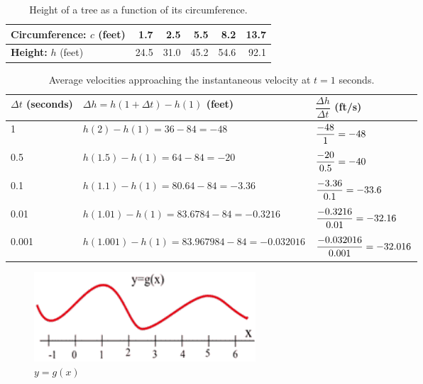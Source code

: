 \begin{enumerate}[label=(\alph*)]

\begin{table}[ht!]
    \centering
    \begin{tabular}{l*{5}{r}}
    \toprule
    {\bf Circumference:} $c$ (feet) & 1.7 & 2.5 & 5.5 & 8.2 & 13.7\tabularnewline
    \midrule
    {\bf Height:} $h$ (feet) & 24.5 & 31.0 & 45.2 & 54.6 & 92.1\tabularnewline
    \bottomrule
    \end{tabular}
    \caption{Height of a tree as a function of its circumference.}
    \label{tab:1-tree}
\end{table}

\begin{table}[ht!]
    \centering
    \begin{tabular}{lll}
    \toprule
    $\Delta t$ (seconds) & $\Delta h = h(1+\Delta t)-h(1)$ (feet) & $\dfrac{\Delta h}{\Delta t}$ (ft/s) \\
    \midrule
    1       & $h(2) - h(1) = 36-84 = -48$                   & $\dfrac{-48\mathstrut}{1\mathstrut} = -48$ \\
    0.5     & $h(1.5) - h(1) = 64-84 = -20$                 & $\dfrac{-20\mathstrut}{0.5\mathstrut} = -40$ \\
    0.1     & $h(1.1) - h(1) = 80.64-84 = -3.36$            & $\dfrac{-3.36\mathstrut}{0.1\mathstrut} = -33.6$ \\
    0.01    & $h(1.01) - h(1) = 83.6784-84 = -0.3216$       & $\dfrac{-0.3216\mathstrut}{0.01\mathstrut} = -32.16$ \\
    0.001   & $h(1.001) - h(1) = 83.967984-84 = -0.032016$  & $\dfrac{-0.032016\mathstrut}{0.001\mathstrut} = -32.016$ \\
    \bottomrule
    \end{tabular}
    \caption{Average velocities approaching the instantaneous velocity at $t=1$ seconds.}
    \label{tab:2-2-tomato-velocity}
\end{table}

\begin{figure}[!ht]
  \centering
    \includegraphics[width=0.4\textwidth]{img/chap2/image006.png}
    \caption{$y=g(x)$}
    \label{fig:2-2-gx}
\end{figure}


\end{enumerate}
